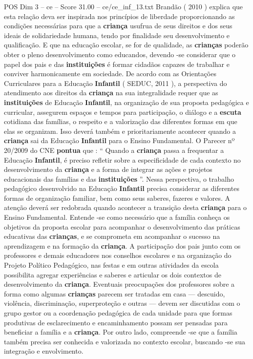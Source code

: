 \begin{textsample}{POS Dim 3 – ce – Score 31.00 – ce/ce\_inf\_13.txt}
Brandão ( 2010 ) explica que esta relação deva ser inspirada nos princípios de liberdade proporcionando as condições necessárias para que a \textbf{criança} usufrua de seus direitos e dos seus ideais de solidariedade humana, tendo por finalidade seu desenvolvimento e qualificação.
E que na educação escolar, se for de qualidade, as \textbf{crianças} poderão obter o pleno desenvolvimento como educandos, devendo -se considerar que o papel dos pais e das \textbf{instituições} é formar cidadãos capazes de trabalhar e conviver harmonicamente em sociedade.
De acordo com as Orientações Curriculares para a Educação \textbf{Infantil} ( SEDUC, 2011 ), a perspectiva do atendimento aos direitos da \textbf{criança} na sua integralidade requer que as \textbf{instituições} de Educação \textbf{Infantil}, na organização de sua proposta pedagógica e curricular, assegurem espaços e tempos para participação, o diálogo e a \textbf{escuta} cotidiana das famílias, o respeito e a valorização das diferentes formas em que elas se organizam.
Isso deverá também e prioritariamente acontecer quando a \textbf{criança} sai da Educação \textbf{Infantil} para o Ensino Fundamental.
O Parecer nº 20/2009 do CNE \textbf{pontua} que : “ Quando a \textbf{criança} passa a frequentar a Educação \textbf{Infantil}, é preciso refletir sobre a especificidade de cada contexto no desenvolvimento da \textbf{criança} e a forma de integrar as ações e projetos educacionais das famílias e das \textbf{instituições} ”.
Nessa perspectiva, o trabalho pedagógico desenvolvido na Educação \textbf{Infantil} precisa considerar as diferentes formas de organização familiar, bem como seus saberes, fazeres e valores.
A atenção deverá ser redobrada quando acontecer a transição desta \textbf{criança} para o Ensino Fundamental.
Entende -se como necessário que a família conheça os objetivos da proposta escolar para acompanhar o desenvolvimento das práticas educativas das \textbf{crianças}, e se comprometa em acompanhar o sucesso na aprendizagem e na formação da \textbf{criança}.
A participação dos pais junto com os professores e demais educadores nos conselhos escolares e na organização do Projeto Político Pedagógico, nas festas e em outras atividades da escola possibilita agregar experiências e saberes e articular os dois contextos de desenvolvimento da \textbf{criança}.
Eventuais preocupações dos professores sobre a forma como algumas \textbf{crianças} parecem ser tratadas em casa — descuido, violência, discriminação, superproteção e outras — devem ser discutidas com o grupo gestor ou a coordenação pedagógica de cada unidade para que formas produtivas de esclarecimento e encaminhamento possam ser pensadas para beneficiar a família e a \textbf{criança}.
Por outro lado, compreende -se que a família também precisa ser conhecida e valorizada no contexto escolar, buscando -se sua integração e envolvimento.

\end{textsample}
